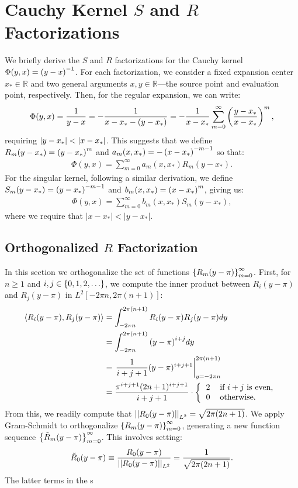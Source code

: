 \section{Cauchy Kernel $S$ and $R$ Factorizations}

We briefly derive the $S$
and $R$
factorizations for the Cauchy kernel $\Phi(y, x) = \left(y - x\right)^{-1}$.
For each factorization, we consider a fixed expansion center
$x_* \in \mathbb{R}$
and two general arguments $x, y \in \mathbb{R}$\----the source point and evaluation point, respectively.  Then, for
the regular expansion, we can write:
\begin{align*}
  \Phi(y, x) = {1 \over y - x} = -{1 \over x - x_* - (y - x_*)} = -{1 \over x - x_*} \sum_{m=0}^\infty \left(y - x_* \over x - x_*\right)^m,
\end{align*}
requiring $\left|y - x_*\right| < \left|x - x_*\right|$.
This suggests that we define $R_m(y - x_*) = \left(y - x_*\right)^m$ and $a_m(x, x_*) = -\left(x - x_*\right)^{-m-1}$ so that:
\begin{align*}
  \Phi(y, x) = \sum_{m=0}^\infty a_m(x, x_*) R_m(y - x_*).
\end{align*}
For the singular kernel, following a similar derivation, we define $S_m(y - x_*) = \left(y - x_*\right)^{-m-1}$ and $b_m(x, x_*) = \left(x - x_*\right)^m$, giving us:
\begin{align*}
  \Phi(y, x) = \sum_{m=0}^\infty b_m(x, x_*) S_m(y - x_*),
\end{align*}
where we require that $|x - x_*| < |y - x_*|$. \\

\subsection{Orthogonalized $R$ Factorization}

In this section we orthogonalize the set of functions
$\left\{R_m(y-\pi)\right\}_{m=0}^\infty$. First, for $n \geq 1$ and
$i, j \in \left\{0, 1, 2, \hdots\right\}$, we compute the inner product between
$R_i(y - \pi)$ and $R_j(y - \pi)$ in $L^2[-2\pi n, 2\pi(n+1)]$:
\begin{align*}
  \ip{R_i(y - \pi), R_j(y - \pi)} &= \int_{-2\pi n}^{2\pi(n+1)} R_i(y - \pi)R_j(y - \pi) dy \\
  &= \int_{-2\pi n}^{2\pi(n+1)} {(y - \pi)}^{i+j} dy \\
  &= \left. \frac{1}{i+j+1} (y - \pi)^{i+j+1} \right|_{y = -2\pi n}^{2\pi(n+1)} \\
  &= \frac{\pi^{i+j+1} (2n + 1)^{i+j+1}}{i+j+1} \cdot \left\{ \begin{tabular}{cl} 2 & if $i + j$ is even, \\ 0 & otherwise. \end{tabular} \right.
\end{align*}
From this, we readily compute that
$\left|\left|R_0(y - \pi)\right|\right|_{L^2} = \sqrt{2\pi(2n + 1)}$. We apply
Gram-Schmidt to orthogonalize $\left\{R_m(y - \pi)\right\}_{m=0}^\infty$,
generating a new function sequence
$\left\{\tilde{R}_m(y - \pi)\right\}_{m=0}^\infty$. This involves setting:
\begin{align*}
  \tilde{R}_0(y - \pi) \equiv \frac{R_0(y - \pi)}{\left|\left|R_0(y - \pi)\right|\right|_{L^2}} = \frac{1}{\sqrt{2\pi(2n + 1)}}.
\end{align*}
The latter terms in the s

